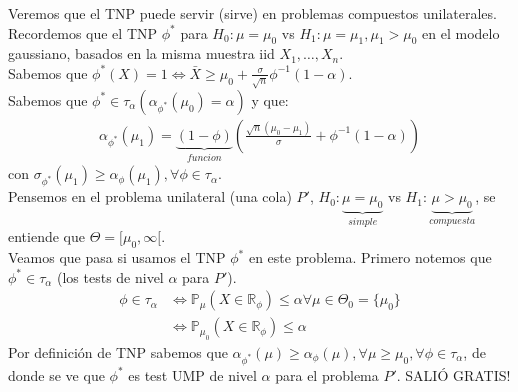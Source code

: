 \documentclass[10pt]{article}
\theoremstyle{plain}
\theoremstyle{definition}
\begin{document}
Veremos que el TNP puede servir (sirve) en problemas compuestos unilaterales.\\
Recordemos que el TNP $\phi^*$ para $H_{0}: \mu = \mu_{0}$ vs $H_{1}: \mu = \mu_{1}, \mu_{1}>\mu_{0}$ en el modelo gaussiano, basados en la misma muestra iid $X_{1},\ldots,X_{n}$.\\
Sabemos que $\phi^*(X)=1 \Leftrightarrow \bar{X} \ge \mu_{0} + \frac{\sigma}{\sqrt{n}}\phi^{-1}(1-\alpha)$.\\
Sabemos que $\phi^* \in \tau_{\alpha} (\alpha_{\phi^*}(\mu_{0}) = \alpha)$ y que:
\begin{align*}
\alpha_{\phi^*}(\mu_{1}) = \underbrace{(1-\phi)}_{funcion} \left(\frac{\sqrt{n}(\mu_{0}-\mu_{1})}{\sigma}+ \phi^{-1}(1-\alpha)\right)
\end{align*}
con $\sigma_{\phi^*}(\mu_{1}) \ge \alpha_{\phi}(\mu_{1}), \forall \phi \in \tau_{\alpha}$.\\

Pensemos en el problema unilateral (una cola) $P'$, $H_{0}: \underbrace{\mu = \mu_{0}}_{simple}$ vs $H_{1}: \underbrace{\mu > \mu_{0}}_{compuesta}$, se entiende que $\Theta = [\mu_{0},\infty[$.\\
Veamos que pasa si usamos el TNP $\phi^*$ en este problema. Primero notemos que $\phi^* \in \tau_{\alpha}$ (los tests de nivel $\alpha$ para $P'$).\\
\begin{align*}
 \phi \in \tau_{\alpha} & \Leftrightarrow \mathbb{P}_{\mu}(X\in \mathbb{R}_{\phi}) \le \alpha \forall \mu \in \Theta_{0} = \{\mu_{0}\}\\
 & \Leftrightarrow \mathbb{P}_{\mu_{0}}(X\in \mathbb{R}_{\phi}) \le \alpha
\end{align*}
Por definición de TNP sabemos que $\alpha_{\phi^*}(\mu) \ge \alpha_{\phi}(\mu), \forall \mu \ge \mu_{0}, \forall \phi \in \tau_{\alpha}$, de donde se ve que $\phi^*$ es test UMP de nivel $\alpha$ para el problema $P'$. SALIÓ GRATIS!\\
\end{document}
